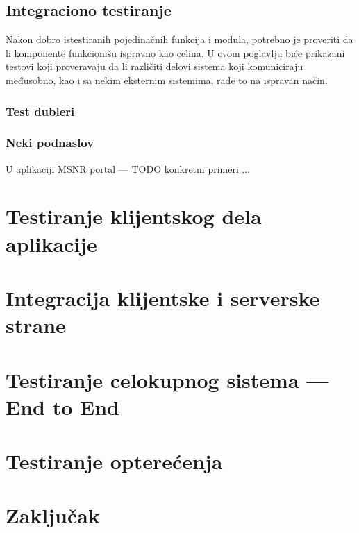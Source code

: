 \documentclass[12pt,oneside]{memoir}
\begin{document}
\section{Integraciono testiranje}
\label{sec:elixint}
\par Nakon dobro istestiranih pojedinačnih funkcija i modula, potrebno je proveriti da li komponente funkcionišu ispravno kao celina. U ovom poglavlju biće prikazani testovi koji proveravaju da li različiti delovi sistema koji komuniciraju međusobno, kao i sa nekim eksternim sistemima, rade to na ispravan način.

\subsection{Test dubleri}

\par 

\subsection{Neki podnaslov}
U aplikaciji MSNR portal --- TODO konkretni primeri ... 

\chapter{Testiranje klijentskog dela aplikacije}
\label{chp:elm}

\chapter{Integracija klijentske i serverske strane}
\label{chp:elmelixir}

\chapter{Testiranje celokupnog sistema --- End to End}
\label{chp:e2e}

\chapter{Testiranje opterećenja}
\label{chp:load}

\chapter{Zaključak}
\end{document}
